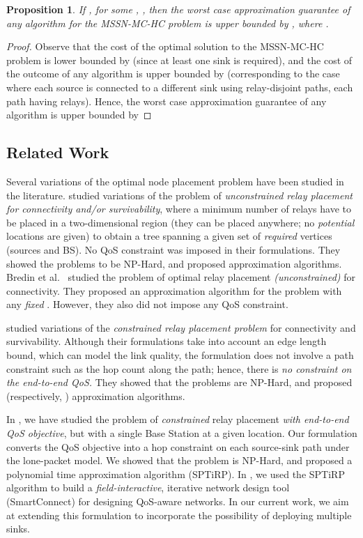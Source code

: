 \documentclass[conference]{IEEEtran}
\newtheorem{proposition}{Proposition}
\begin{document}
\begin{proposition}
If , for some , , then the worst case approximation guarantee of any algorithm for the MSSN-MC-HC problem is upper bounded by , where . 
\end{proposition}
\begin{proof}
Observe that the cost of the optimal solution to the MSSN-MC-HC problem is lower bounded by  (since at least one sink is required), and the cost of the outcome of any algorithm is upper bounded by  (corresponding to the case where each source is connected to a different sink using relay-disjoint paths, each path having  relays). Hence, the worst case approximation guarantee of any algorithm is upper bounded by


\end{proof}

\subsection{Related Work}
Several variations of the optimal node placement problem have been studied in the literature. \cite{Lin,cheng,Lloyd} studied variations of the problem of \emph{unconstrained relay placement for connectivity and/or survivability}, where a minimum number of relays have to be placed in a two-dimensional region (they can be placed anywhere; no \emph{potential} locations are given) to obtain a tree spanning a given set of \emph{required} vertices (sources and BS). No QoS constraint was imposed in their formulations. They showed the problems to be NP-Hard, and proposed approximation algorithms. Bredin et al.\ \cite{bredin} studied the problem of optimal relay placement \emph{(unconstrained)} for connectivity. They proposed an  approximation algorithm for the problem with any \emph{fixed} . However, they also did not impose any QoS constraint. 

\cite{Misra,yang} studied variations of the \emph{constrained relay placement problem} for connectivity and survivability. Although their formulations take into account an edge length bound, which can model the link quality, the formulation does not involve a path constraint such as the hop count along the path; hence, there is \emph{no constraint on the end-to-end QoS.} They showed that the problems are NP-Hard, and proposed  (respectively, ) approximation algorithms. 

In \cite{iwqos,fullpaper}, we have studied the problem of \emph{constrained} relay placement \emph{with end-to-end QoS objective}, but with a single Base Station at a given location. Our formulation converts the QoS objective into a hop constraint on each source-sink path under the lone-packet model. We showed that the problem is NP-Hard, and proposed a polynomial time approximation algorithm (SPTiRP). In \cite{smartconnect-paper}, we used the SPTiRP algorithm to build a  \emph{field-interactive}, iterative network design tool (SmartConnect) for designing QoS-aware networks. In our current work, we aim at extending this formulation to incorporate the possibility of deploying multiple sinks. 
  
\end{document}
